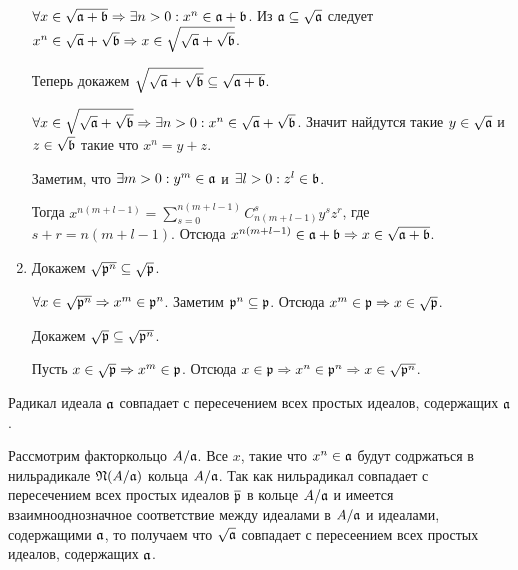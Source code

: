 \begin{Proof}
\begin{enumerate}
                $\forall x \in \sqrt{\mathfrak{a} + \mathfrak{b}} \Rightarrow \exists n > 0 : x^n \in \mathfrak{a} + \mathfrak{b}$. 
                Из $\mathfrak{a} \subseteq \sqrt{\mathfrak{a}}$ следует \newline $x^n \in \sqrt{\mathfrak{a}} + \sqrt{\mathfrak{b}} \Rightarrow x \in \sqrt{\sqrt{\mathfrak{a}} + \sqrt{\mathfrak{b}} }$.

                Теперь докажем $\sqrt{\sqrt{\mathfrak{a}} + \sqrt{\mathfrak{b}}} \subseteq \sqrt{\mathfrak{a} + \mathfrak{b}}$.

                $\forall x \in \sqrt{\sqrt{\mathfrak{a}} + \sqrt{\mathfrak{b}}} \Rightarrow \exists n > 0 : x^n \in \sqrt{\mathfrak{a}} + \sqrt{\mathfrak{b}}$. 
                Значит найдутся такие $y \in \sqrt{\mathfrak{a}}$ и $z \in \sqrt{\mathfrak{b}}$ такие что $x^n = y + z$. 
                
                Заметим, что $\exists m > 0 : y^m \in \mathfrak{a}$ и $\exists l > 0 : z^l \in \mathfrak{b}$.

                Тогда $x^{n(m + l - 1)} = \sum_{s = 0}^{n(m + l - 1)} C_{n(m + l - 1)}^s y^sz^r$, где $s + r = n(m + l - 1)$. Отсюда 
                $x^{n(m + l - 1)}  \in \mathfrak{a} + \mathfrak{b} \Rightarrow x \in \sqrt{\mathfrak{a} + \mathfrak{b}}$.
            \item Докажем $\sqrt{\mathfrak{p}^n} \subseteq \sqrt{\mathfrak{p}}$.
            
                $\forall x \in \sqrt{\mathfrak{p}^n} \Rightarrow x^m \in \mathfrak{p}^n$. Заметим $\mathfrak{p}^n \subseteq \mathfrak{p}$. 
                Отсюда $x^m \in \mathfrak{p} \Rightarrow x \in \sqrt{\mathfrak{p}}$.

                Докажем $\sqrt{\mathfrak{p}} \subseteq \sqrt{\mathfrak{p}^n}$. 
                
                Пусть $x \in \sqrt{\mathfrak{p}} \Rightarrow x^m \in \mathfrak{p}$. Отсюда $x \in \mathfrak{p} \Rightarrow x^n \in \mathfrak{p}^n \Rightarrow x \in \sqrt{\mathfrak{p}^n}$.
        \end{enumerate}
    \end{Proof}

    \begin{Theorem} {\cite{A-M}}
        Радикал идеала $\mathfrak{a}$ совпадает с пересечением всех простых идеалов, содержащих $\mathfrak{a}$.
    \end{Theorem}
    \begin{Proof}
        Рассмотрим факторкольцо $A/\mathfrak{a}$. Все $x$, такие что $x^n \in \mathfrak{a}$ будут содржаться в нильрадикале
        $\mathfrak{N}(A/\mathfrak{a})$ кольца $A/\mathfrak{a}$. Так как нильрадикал совпадает с пересечением всех простых идеалов $\overline{\mathfrak{p}}$
        в кольце $A/\mathfrak{a}$ и имеется взаимнооднозначное соответствие между идеалами в $A/\mathfrak{a}$ и идеалами, содержащими $\mathfrak{a}$, 
        то получаем что $\sqrt{\mathfrak{a}}$ совпадает с пересеением всех простых идеалов, содержащих $\mathfrak{a}$.
    \end{Proof}
